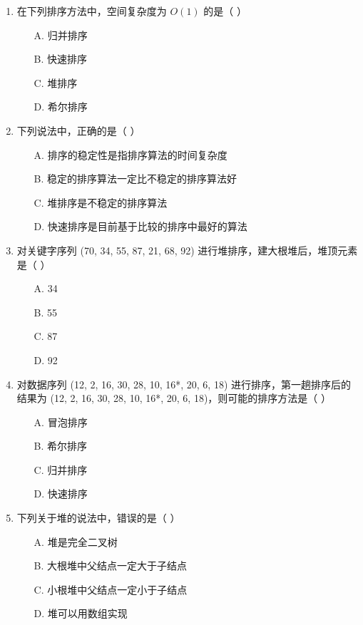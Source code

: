 \documentclass[12pt, a4paper]{article}
\begin{document}
\begin{enumerate}[label=\arabic*.]
	\item 在下列排序方法中，空间复杂度为 $O(1)$ 的是（ ）
	      \begin{enumerate}
		      \item[A.] 归并排序
		      \item[B.] 快速排序
		      \item[C.] 堆排序
		      \item[D.] 希尔排序
	      \end{enumerate}

	\item 下列说法中，正确的是（ ）
	      \begin{enumerate}
		      \item[A.] 排序的稳定性是指排序算法的时间复杂度
		      \item[B.] 稳定的排序算法一定比不稳定的排序算法好
		      \item[C.] 堆排序是不稳定的排序算法
		      \item[D.] 快速排序是目前基于比较的排序中最好的算法
	      \end{enumerate}

	\item 对关键字序列 (70, 34, 55, 87, 21, 68, 92) 进行堆排序，建大根堆后，堆顶元素是（ ）
	      \begin{enumerate}
		      \item[A.] 34
		      \item[B.] 55
		      \item[C.] 87
		      \item[D.] 92
	      \end{enumerate}

	\item 对数据序列 (12, 2, 16, 30, 28, 10, 16*, 20, 6, 18) 进行排序，第一趟排序后的结果为 (12, 2, 16, 30, 28, 10, 16*, 20, 6, 18)，则可能的排序方法是（ ）
	      \begin{enumerate}
		      \item[A.] 冒泡排序
		      \item[B.] 希尔排序
		      \item[C.] 归并排序
		      \item[D.] 快速排序
	      \end{enumerate}

	\item 下列关于堆的说法中，错误的是（ ）
	      \begin{enumerate}
		      \item[A.] 堆是完全二叉树
		      \item[B.] 大根堆中父结点一定大于子结点
		      \item[C.] 小根堆中父结点一定小于子结点
		      \item[D.] 堆可以用数组实现
	      \end{enumerate}


\end{enumerate}
\end{document}
